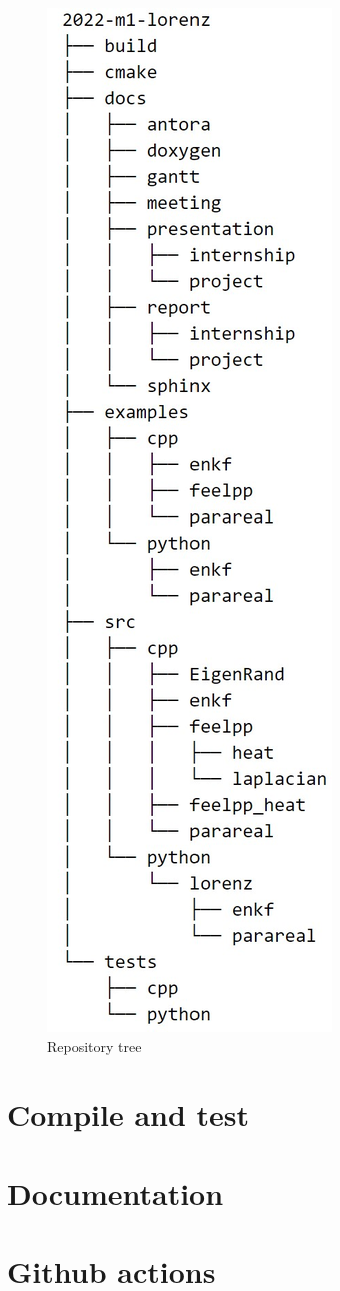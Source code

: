 	\begin{minipage}{0.33\linewidth}
		\begin{figure}[H]
			\includegraphics[width=\textwidth]{"images/appendix/tree.jpg"}
			\caption{Repository tree}
			\label{tree}
		\end{figure}
	\end{minipage}

\section{Compile and test}
\label{compile}

\section{Documentation}
\label{doc}

\section{Github actions}
\label{ci}